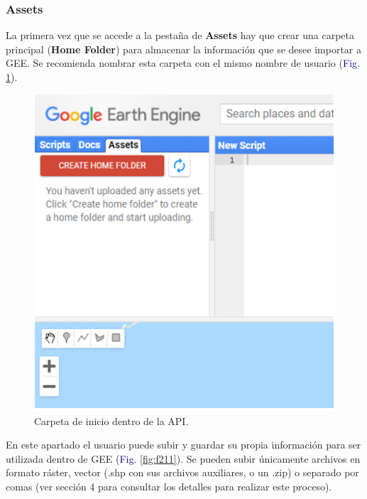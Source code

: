 \documentclass[
  12pt,
  letterpaper,
  twoside]{book}
\begin{document}
\hypertarget{assets}{%
\subsubsection*{Assets}\label{assets}}

La primera vez que se accede a la pestaña de \textbf{Assets} hay que crear una carpeta principal (\textbf{Home Folder}) para almacenar la información que se desee importar a GEE. Se recomienda nombrar esta carpeta con el mismo nombre de usuario (\textcolor{darkblue}{Fig.} \ref{fig:f210}).

\begin{figure}[H]

{\centering \includegraphics[width=0.6\linewidth]{Img/homeFolder} 

}

\caption{Carpeta de inicio dentro de la API.}\label{fig:f210}
\end{figure}

En este apartado el usuario puede subir y guardar su propia información para ser utilizada dentro de GEE (\textcolor{darkblue}{Fig.} \ref{fig:f211}). Se pueden subir únicamente archivos en formato ráster, vector (.shp con sus archivos auxiliares, o un .zip) o separado por comas (ver sección 4 para consultar los detalles para realizar este proceso).
\end{document}
